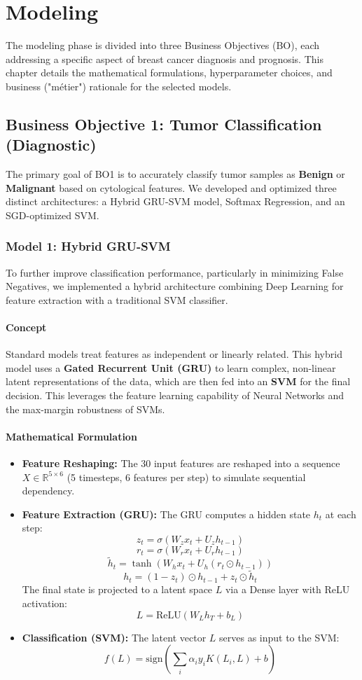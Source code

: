 \chapter{Modeling}

The modeling phase is divided into three Business Objectives (BO), each addressing a specific aspect of breast cancer diagnosis and prognosis. This chapter details the mathematical formulations, hyperparameter choices, and business ("métier") rationale for the selected models.

\section{Business Objective 1: Tumor Classification (Diagnostic)}
The primary goal of BO1 is to accurately classify tumor samples as \textbf{Benign} or \textbf{Malignant} based on cytological features. We developed and optimized three distinct architectures: a Hybrid GRU-SVM model, Softmax Regression, and an SGD-optimized SVM.

\subsection{Model 1: Hybrid GRU-SVM}
To further improve classification performance, particularly in minimizing False Negatives, we implemented a hybrid architecture combining Deep Learning for feature extraction with a traditional SVM classifier.

\subsubsection{Concept}
Standard models treat features as independent or linearly related. This hybrid model uses a \textbf{Gated Recurrent Unit (GRU)} to learn complex, non-linear latent representations of the data, which are then fed into an \textbf{SVM} for the final decision. This leverages the feature learning capability of Neural Networks and the max-margin robustness of SVMs.

\subsubsection{Mathematical Formulation}
\begin{itemize}
    \item \textbf{Feature Reshaping:} The 30 input features are reshaped into a sequence $X \in \mathbb{R}^{5 \times 6}$ (5 timesteps, 6 features per step) to simulate sequential dependency.
    \item \textbf{Feature Extraction (GRU):} The GRU computes a hidden state $h_t$ at each step:
    \[ z_t = \sigma(W_z x_t + U_z h_{t-1}) \]
    \[ r_t = \sigma(W_r x_t + U_r h_{t-1}) \]
    \[ \tilde{h}_t = \tanh(W_h x_t + U_h (r_t \odot h_{t-1})) \]
    \[ h_t = (1 - z_t) \odot h_{t-1} + z_t \odot \tilde{h}_t \]
    The final state is projected to a latent space $L$ via a Dense layer with ReLU activation:
    \[ L = \text{ReLU}(W_L h_T + b_L) \]
    \item \textbf{Classification (SVM):} The latent vector $L$ serves as input to the SVM:
    \[ f(L) = \text{sign}\left(\sum_{i} \alpha_i y_i K(L_i, L) + b\right) \]
\end{itemize}

